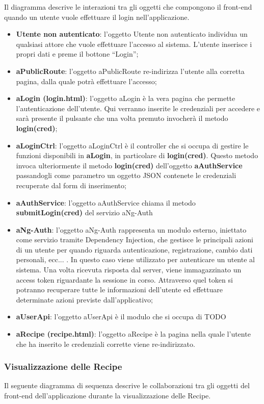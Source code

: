 	Il diagramma descrive le interazioni tra gli oggetti che compongono il front-end quando un utente vuole effettuare il login nell'applicazione.
	\begin{itemize}
		\item \textbf{Utente non autenticato}: l'oggetto Utente non autenticato individua un qualsiasi attore che vuole effettuare l'accesso al sistema. L'utente inserisce i propri dati e preme il bottone ``Login'';
		\item \textbf{aPublicRoute}: l'oggetto aPublicRoute re-indirizza l'utente alla corretta pagina, dalla quale potrà effettuare l'accesso;
		\item \textbf{aLogin (login.html)}: l'oggetto aLogin è la vera pagina che permette l'autenticazione dell'utente. Qui verranno inserite le credenziali per accedere e sarà presente il pulsante che una volta premuto invocherà il metodo \textbf{login(cred)};
		\item \textbf{aLoginCtrl}: l'oggetto aLoginCtrl è il controller che si occupa di gestire le funzioni disponibili in \textbf{aLogin}, in particolare di \textbf{login(cred)}. Questo metodo invoca ulteriormente il metodo \textbf{login(cred)} dell'oggetto \textbf{aAuthService} passandogli come parametro un oggetto JSON contenete le credenziali recuperate dal form di inserimento;
		\item \textbf{aAuthService}: l'oggetto aAuthService chiama il metodo \textbf{submitLogin(cred)} del servizio aNg-Auth
		\item \textbf{aNg-Auth}: l'oggetto aNg-Auth rappresenta un modulo esterno, iniettato come servizio tramite Dependency Injection, che gestisce le principali azioni di un utente per quando riguarda autenticazione, registrazione, cambio dati personali, ecc... . In questo caso viene utilizzato per autenticare un utente al sistema. Una volta ricevuta risposta dal server, viene immagazzinato un access token riguardante la sessione in corso. Attraverso quel token si potranno recuperare tutte le informazioni dell'utente ed effettuare determinate azioni previste dall'applicativo;
		\item \textbf{aUserApi}: l'oggetto aUserApi è il modulo che si occupa di TODO
		\item \textbf{aRecipe (recipe.html)}: l'oggetto aRecipe è la pagina nella quale l'utente che ha inserito le credenziali corrette viene re-indirizzato.
	\end{itemize}

	\subsubsection{Visualizzazione delle Recipe} %
	\label{ssub:visualizzazione_delle_recipe}
	Il seguente diagramma di sequenza descrive le collaborazioni tra gli oggetti del front-end dell'applicazione durante la visualizzazione delle Recipe. \newline

